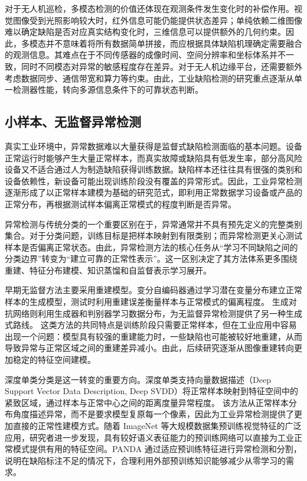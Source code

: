 对于无人机巡检，多模态检测的价值还体现在观测条件发生变化时的补偿作用。视觉图像受到光照影响较大时，红外信息可能仍能提供状态差异；单纯依赖二维图像难以确定缺陷是否对应真实结构变化时，三维信息可以提供额外的几何约束。因此，多模态并不意味着将所有数据简单拼接，而应根据具体缺陷机理确定需要融合的观测信息。其难点在于不同传感器的成像时间、空间分辨率和坐标体系并不一致，同时不同模态对异常的敏感程度存在差异。对于无人机边缘平台，还需要额外考虑数据同步、通信带宽和算力等约束。由此，工业缺陷检测的研究重点逐渐从单一检测器性能，转向多源信息条件下的可靠状态判断。

\subsection{小样本、无监督异常检测}

真实工业环境中，异常数据难以大量获得是监督式缺陷检测面临的基本问题。设备正常运行时能够产生大量正常样本，而真实故障或缺陷具有低发生率，部分高风险设备又不适合通过人为制造缺陷获得训练数据。缺陷样本还往往具有很强的类别和设备依赖性，新设备可能出现训练阶段没有覆盖的异常形式。因此，工业异常检测逐渐形成了以正常样本建模为基础的研究范式，即利用正常数据学习设备或产品的正常分布，再根据测试样本偏离正常模式的程度判断是否异常\cite{Pang2021DeepAD,Diers2023IJCVIQC,Liu2024IADSurvey,li2025iadreview,shukla2025iadsurvey}。

异常检测与传统分类的一个重要区别在于，异常通常并不具有预先定义的完整类别集合。对于分类问题，训练目标是把样本映射到有限类别；而异常检测更关心测试样本是否偏离正常状态。由此，异常检测方法的核心任务从“学习不同缺陷之间的分类边界”转变为“建立可靠的正常性表示”。这一区别决定了其方法体系更多围绕重建、特征分布建模、知识蒸馏和自监督表示学习展开\cite{Pang2021DeepAD,Diers2023IJCVIQC,Li2025IADSurvey}。

早期无监督方法主要采用重建模型。变分自编码器通过学习潜在变量分布建立正常样本的生成模型，测试时利用重建误差衡量样本与正常模式的偏离程度\cite{Kingma2014VAE}。 生成对抗网络则利用生成器和判别器学习数据分布，为无监督异常检测提供了另一种生成式路线\cite{Goodfellow2014GAN}。 这类方法的共同特点是训练阶段只需要正常样本，但在工业应用中容易出现一个问题：模型具有较强的重建能力时，一些缺陷也可能被较好地重建，从而导致异常与正常区域之间的重建差异减小。由此，后续研究逐渐从图像重建转向更加稳定的特征空间建模。

深度单类分类是这一转变的重要方向。深度单类支持向量数据描述（Deep Support Vector Data Description, Deep SVDD）将正常样本映射到特征空间中的紧致区域，通过样本与正常中心之间的距离度量异常程度\cite{Ruff2018DeepSVDD}。 该方法从正常样本分布角度描述异常，而不是要求模型复原每一个像素，因此为工业异常检测提供了更加直接的正常性建模方式。随着 ImageNet 等大规模数据集预训练视觉特征的广泛应用，研究者进一步发现，具有较好语义表征能力的预训练网络可以直接为工业正常模式提供有用的特征空间。PANDA 通过适应预训练特征进行异常检测和分割，说明在缺陷标注不足的情况下，合理利用外部预训练知识能够减少从零学习的需求\cite{Reiss2021PANDA}。

